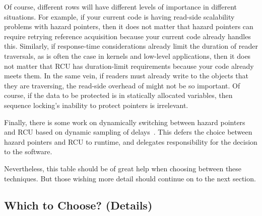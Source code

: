 \QuickQuizEnd

Of course, different rows will have different levels of importance in
different situations.
For example, if your current code is having read-side scalability problems
with hazard pointers, then it does not matter that hazard pointers can require
retrying reference acquisition because your current code already handles
this.
Similarly, if response-time considerations already limit the duration
of reader traversals, as is often the case in kernels and low-level
applications, then it does not matter that RCU has duration-limit
requirements because your code already meets them.
In the same vein, if readers must already write to the objects that they
are traversing, the read-side overhead of  might
not be so important.
Of course, if the data to be protected is in statically allocated variables,
then sequence locking's inability to protect pointers is irrelevant.

Finally, there is some work on dynamically switching between hazard
pointers and RCU based on dynamic sampling of
delays~\cite{Balmau:2016:FRM:2935764.2935790}.
This defers the choice between hazard pointers and RCU to runtime,
and delegates responsibility for the decision to the software.

Nevertheless, this table should be of great help when choosing between
these techniques.
But those wishing more detail should continue on to the next section.

\subsection{Which to Choose? (Details)}
\label{sec:defer:Which to Choose? (Details)}

